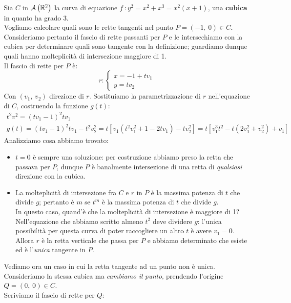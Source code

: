 \begin{example} \label{esempiocurvaq}	Sia $C$ in ${\mathcal{A}\left(\mathbb{R}^2\right)}$ la curva di equazione $f\ \colon y^2=x^2+x^3=x^2(x+1)$, una \textbf{cubica} in quanto ha grado 3.\\
Vogliamo calcolare quali sono le rette tangenti nel punto $P=(-1,\ 0)\in C$. Consideriamo pertanto il fascio di rette passanti per $P$ e le intersechiamo con la cubica per determinare quali sono tangente con la definizione; guardiamo dunque quali hanno molteplicità di intersezione maggiore di 1.\\
Il fascio di rette per $P$ è:
\begin{equation*}
	r\colon \begin{cases}
		x=-1+tv_1\\
		y=tv_2
	\end{cases}
\end{equation*}
Con $(v_1,\ v_2)$ direzione di $r$. Sostituiamo la parametrizzazione di $r$ nell'equazione di $C$, costruendo la funzione $g\left(t\right)$:
	\begin{gather*}
		t^2v^2=(tv_1-1)^2 tv_1\\
		g(t)=(tv_1-1)^2tv_1-t^2v_2^2=t[v_1(t^2v_1^2+1-2tv_1)-tv_2^2]=t[v_1^3t^2-t(2v_1^2+v_2^2)+v_1]
	\end{gather*}
	Analizziamo cosa abbiamo trovato:
		\begin{itemize}
			\item $t=0$ è sempre una soluzione: per costruzione abbiamo preso la retta che passava per $P$, dunque $P$ è banalmente intersezione di una retta di \textit{qualsiasi} direzione con la cubica.
			\item La molteplicità di intersezione fra $C$ e $r$ in $P$ è la massima potenza di $t$ che divide $g$; pertanto è $m$ se $t^m$ è la massima potenza di $t$ che divide $g$.\\
			In questo caso, quand'è che la molteplicità di intersezione è maggiore di 1? Nell'equazione che abbiamo scritto almeno $t^2$ deve dividere $g$: l'unica possibilità per questa curva di poter raccogliere un altro $t$ è avere $v_1=0$. Allora $r$ è la retta verticale che passa per $P$ e abbiamo determinato che esiste ed è l'\textit{unica} tangente in $P$.
		\end{itemize}
	Vediamo ora un caso in cui la retta tangente ad un punto non è unica. Consideriamo la stessa cubica ma \textit{cambiamo il punto}, prendendo l'origine $Q=\left(0,\ 0\right)\in C$.\\
	Scriviamo il fascio di rette per $Q$:
	\begin{equation*}

\end{equation*}
\end{example}
